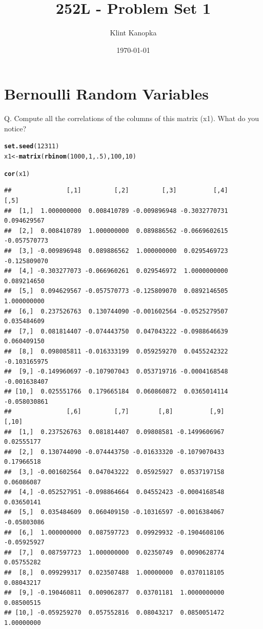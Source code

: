 \documentclass[letterpaper,12pt]{article}\usepackage[]{graphicx}\usepackage[]{color}
\title{252L - Problem Set 1}
\author{Klint Kanopka}
\date{\today}
\makeatletter
\newcommand{\hlnum}[1]{\textcolor[rgb]{0.686,0.059,0.569}{#1}}%
\newcommand{\hlstd}[1]{\textcolor[rgb]{0.345,0.345,0.345}{#1}}%
\newcommand{\hlkwb}[1]{\textcolor[rgb]{0.69,0.353,0.396}{#1}}%
\newcommand{\hlkwd}[1]{\textcolor[rgb]{0.737,0.353,0.396}{\textbf{#1}}}%
\newenvironment{kframe}{%
 \def\at@end@of@kframe{}%
 \ifinner\ifhmode%
  \def\at@end@of@kframe{\end{minipage}}%
  \begin{minipage}{\columnwidth}%
 \fi\fi%
 \def\FrameCommand##1{\hskip\@totalleftmargin \hskip-\fboxsep
 \colorbox{shadecolor}{##1}\hskip-\fboxsep
     \hskip-\linewidth \hskip-\@totalleftmargin \hskip\columnwidth}%
 \MakeFramed {\advance\hsize-\width
   \@totalleftmargin\z@ \linewidth\hsize
   \@setminipage}}%
 {\par\unskip\endMakeFramed%
 \at@end@of@kframe}
\newenvironment{knitrout}{}{} %
\numberwithin{equation}{section}
\makeatother
\begin{document}
\maketitle



\section{Bernoulli Random Variables}

Q. Compute all the correlations of the columns of this matrix (x1). What do you notice?

\begin{knitrout}
\color{fgcolor}\begin{kframe}
\begin{alltt}
\hlkwd{set.seed}\hlstd{(}\hlnum{12311}\hlstd{)}
\hlstd{x1}\hlkwb{<-}\hlkwd{matrix}\hlstd{(}\hlkwd{rbinom}\hlstd{(}\hlnum{1000}\hlstd{,}\hlnum{1}\hlstd{,}\hlnum{.5}\hlstd{),}\hlnum{100}\hlstd{,}\hlnum{10}\hlstd{)}

\hlkwd{cor}\hlstd{(x1)}
\end{alltt}
\begin{verbatim}
##               [,1]         [,2]         [,3]          [,4]         [,5]
##  [1,]  1.000000000  0.008410789 -0.009896948 -0.3032770731  0.094629567
##  [2,]  0.008410789  1.000000000  0.089886562 -0.0669602615 -0.057570773
##  [3,] -0.009896948  0.089886562  1.000000000  0.0295469723 -0.125809070
##  [4,] -0.303277073 -0.066960261  0.029546972  1.0000000000  0.089214650
##  [5,]  0.094629567 -0.057570773 -0.125809070  0.0892146505  1.000000000
##  [6,]  0.237526763  0.130744090 -0.001602564 -0.0525279507  0.035484609
##  [7,]  0.081814407 -0.074443750  0.047043222 -0.0988646639  0.060409150
##  [8,]  0.098085811 -0.016333199  0.059259270  0.0455242322 -0.103165975
##  [9,] -0.149960697 -0.107907043  0.053719716 -0.0004168548 -0.001638407
## [10,]  0.025551766  0.179665184  0.060860872  0.0365014114 -0.058030861
##               [,6]         [,7]        [,8]          [,9]       [,10]
##  [1,]  0.237526763  0.081814407  0.09808581 -0.1499606967  0.02555177
##  [2,]  0.130744090 -0.074443750 -0.01633320 -0.1079070433  0.17966518
##  [3,] -0.001602564  0.047043222  0.05925927  0.0537197158  0.06086087
##  [4,] -0.052527951 -0.098864664  0.04552423 -0.0004168548  0.03650141
##  [5,]  0.035484609  0.060409150 -0.10316597 -0.0016384067 -0.05803086
##  [6,]  1.000000000  0.087597723  0.09929932 -0.1904608106 -0.05925927
##  [7,]  0.087597723  1.000000000  0.02350749  0.0090628774  0.05755282
##  [8,]  0.099299317  0.023507488  1.00000000  0.0370118105  0.08043217
##  [9,] -0.190460811  0.009062877  0.03701181  1.0000000000  0.08500515
## [10,] -0.059259270  0.057552816  0.08043217  0.0850051472  1.00000000
\end{verbatim}
\end{kframe}
\end{knitrout}
\end{document}
